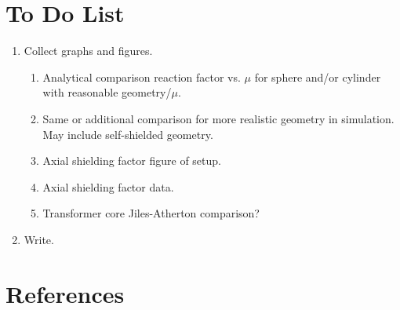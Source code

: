\documentclass[review]{elsarticle}
\begin{document}
\section{To Do List}

\begin{enumerate}
\item Collect graphs and figures.
\begin{enumerate}
\item Analytical comparison reaction factor vs. $\mu$ for
  sphere and/or cylinder with reasonable geometry/$\mu$.
\item Same or additional comparison for more realistic geometry in
  simulation.  May include self-shielded geometry.
\item Axial shielding factor figure of setup.
\item Axial shielding factor data.
\item Transformer core Jiles-Atherton comparison?
\end{enumerate}
\item Write.
\end{enumerate}

\section*{References}
\end{document}
